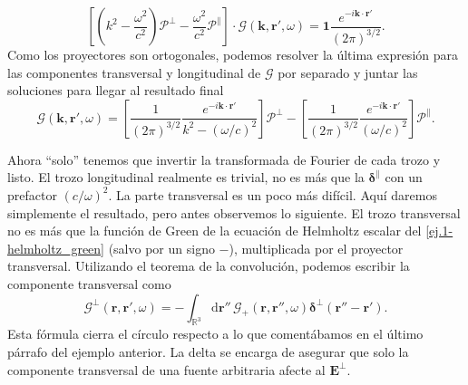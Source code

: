 \begin{example}
    \begin{equation*}
        \left[\left(k^2 - \frac{\omega^2}{c^2}\right)\boldsymbol{\mathcal{P}}^\perp - \frac{\omega^2}{c^2}\boldsymbol{\mathcal{P}}^\parallel\right]\cdot\boldsymbol{\mathcal{G}}(\mathbf{k}, \mathbf{r}', \omega) = \mathbf{1}\frac{e^{-i\mathbf{k}\cdot\mathbf{r}'}}{(2\pi)^{3/2}}.
    \end{equation*}
    Como los proyectores son ortogonales, podemos resolver la última expresión para las componentes transversal y longitudinal de \(\boldsymbol{\mathcal{G}}\) por separado y juntar las soluciones para llegar al resultado final
    \begin{equation}
        \boldsymbol{\mathcal{G}}(\mathbf{k}, \mathbf{r}', \omega) = \left[\frac{1}{(2\pi)^{3/2}}\frac{e^{-i\mathbf{k}\cdot\mathbf{r}'}}{k^2-(\omega/c)^2}\right]\boldsymbol{\mathcal{P}}^\perp 
        - \left[\frac{1}{(2\pi)^{3/2}}\frac{e^{-i\mathbf{k}\cdot\mathbf{r}'}}{(\omega/c)^2}\right]\boldsymbol{\mathcal{P}}^\parallel .
    \end{equation}

    Ahora ``solo'' tenemos que invertir la transformada de Fourier de cada trozo y listo. El trozo longitudinal realmente es trivial, no es más que la \(\boldsymbol{\delta}^\parallel\) con un prefactor \((c/\omega)^2\). La parte transversal es un poco más difícil. Aquí daremos simplemente el resultado, pero antes observemos lo siguiente. El trozo transversal no es más que la función de Green de la ecuación de Helmholtz escalar del \cref{ej.1-helmholtz_green} (salvo por un signo \(-\)), multiplicada por el proyector transversal. Utilizando el teorema de la convolución, podemos escribir la componente transversal como  
    \begin{equation*}
        \boldsymbol{\mathcal{G}}^\perp(\mathbf{r}, \mathbf{r}', \omega) = - \int_{\mathbb{R}^3}\mathrm{d}\mathbf{r}''\, \mathcal{G}_+(\mathbf{r}, \mathbf{r}'',\omega)\boldsymbol{\delta}^\perp(\mathbf{r}''-\mathbf{r}').
    \end{equation*}
    Esta fórmula cierra el círculo respecto a lo que comentábamos en el último párrafo del ejemplo anterior. La delta se encarga de asegurar que solo la componente transversal de una fuente arbitraria afecte al \(\mathbf{E}^\perp\).
    

\end{example}
